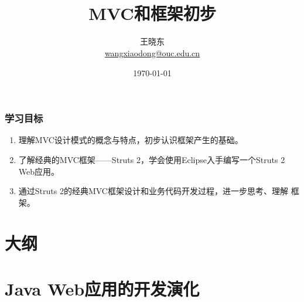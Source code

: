 
\title[KevinW@OUC]{\\  
  MVC和框架初步}
\author[王晓东]{王晓东\\
  \href{mailto:wangxiaodong@ouc.edu.cn}{\footnotesize wangxiaodong@ouc.edu.cn}}
\date{\today}


 \frame{\titlepage}


\begin{frame}
\frametitle{学习目标}
\begin{enumerate}
\item 理解MVC设计模式的概念与特点，初步认识框架产生的基础。
\item 了解经典的MVC框架——Struts 2，学会使用Eclipse入手编写一个Struts 2
  Web应用。
\item 通过Struts 2的经典MVC框架设计和业务代码开发过程，进一步思考、理解
  框架。
\end{enumerate}  
\end{frame}
 
\section*{大纲}

\section{Java Web应用的开发演化}

